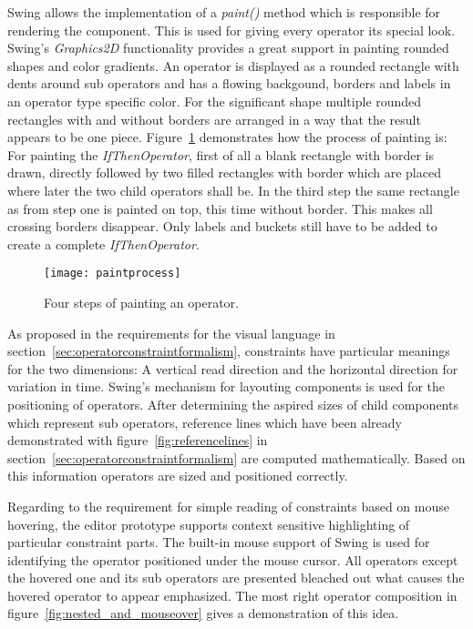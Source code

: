 Swing allows the implementation of a \emph{paint()} method which is responsible for rendering the component. This is used for giving every operator its special look. Swing's \emph{Graphics2D} functionality provides a great support in painting rounded shapes and color gradients. An operator is displayed as a rounded rectangle with dents around sub operators and has a flowing backgound, borders and labels in an operator type specific color. For the significant shape multiple rounded rectangles with and without borders are arranged in a way that the result appears to be one piece. Figure~\ref{fig:paintprocess} demonstrates how the process of painting is: For painting the \emph{IfThenOperator}, first of all a blank rectangle with border is drawn, directly followed by two filled rectangles with border which are placed where later the two child operators shall be. In the third step the same rectangle as from step one is painted on top, this time without border. This makes all crossing borders disappear. Only labels and buckets still have to be added to create a complete \emph{IfThenOperator}.

\begin{figure}[htbp]
  \centering
  \texttt{[image: paintprocess]} 
  \caption{Four steps of painting an operator.}
  \label{fig:paintprocess}
\end{figure}


As proposed in the requirements for the visual language in section~\ref{sec:operatorconstraintformalism}, constraints have particular meanings for the two dimensions: A vertical read direction and the horizontal direction for variation in time. 
Swing's mechanism for layouting components is used for the positioning of operators. After determining the aspired sizes of child components which represent sub operators, reference lines which have been already demonstrated with figure~\ref{fig:referencelines} in section~\ref{sec:operatorconstraintformalism} are computed mathematically. Based on this information operators are sized and positioned correctly.


Regarding to the requirement for simple reading of constraints based on mouse hovering, the editor prototype supports context sensitive highlighting of particular constraint parts.
The built-in mouse support of Swing is used for identifying the operator positioned under the mouse cursor. All operators except the hovered one and its sub operators are presented bleached out what causes the hovered operator to appear emphasized. The most right operator composition in figure~\ref{fig:nested_and_mouseover} gives a demonstration of this idea.

